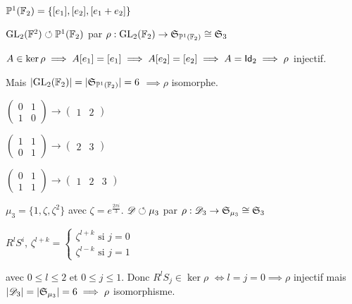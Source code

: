 \documentclass[french,a4paper,10pt]{article}
\begin{document}
	\begin{td-sol}
		$\mathbb{P}^1(\mathbb{F}_2) = \{[e_1], [e_2], [e_1+e_2]\}$
		
		$\text{GL}_{2}(\mathbb{F}^2) \circlearrowleft \mathbb{P}^1(\mathbb{F}_2)$ par $\rho: \text{GL}_{2}(\mathbb{F}_2) \to \mathfrak{S}_{\mathbb{P}^1(\mathbb{F}_2)} \cong
		\mathfrak{S}_3$
		
		$A\in \ker \rho \implies A[e_1] = [e_1]
		\implies A[e_2] = [e_2] \implies A = \operatorname{\mathsf{Id}}_2 \implies \rho$ injectif.
		
		Mais $| \text{GL}_{2}(\mathbb{F}_2) | = | \mathfrak{S}_{\mathbb{P}^1(\mathbb{F}_2)} | = 6$
		$\implies \rho$ isomorphe.
		
		$
		\begin{pmatrix}
			0 & 1 \\ 1 & 0
		\end{pmatrix} \to \begin{pmatrix}
			1 & 2
		\end{pmatrix}
		$
		
		$
		\begin{pmatrix}
			1 & 1 \\ 0 & 1
		\end{pmatrix} \to \begin{pmatrix}
			2 & 3
		\end{pmatrix}
		$
		
		$
		\begin{pmatrix}
			0 & 1 \\ 1 & 1
		\end{pmatrix} \to \begin{pmatrix}
			1 & 2 & 3
		\end{pmatrix}
		$
		
		$\mu_3 = \{1,\zeta,\zeta^2\}$ avec $\zeta = e^{\frac{2\pi i}{3}}$.
		$\mathscr{D} \circlearrowleft \mu_3$ par $\rho: \mathscr{D}_3 \to \mathfrak{S}_{\mu_3} \cong \mathfrak{S}_{3}$
		
		$R^l S^i$, $\zeta^{l+k} = \begin{cases}\zeta^{l+k} \textrm{ si } j = 0\\
			\zeta^{l-k} \textrm{ si } j = 1 \end{cases}$
		
		avec $0 \leq l \leq 2$ et $0\leq j\leq 1$. Donc $R^lS_j\in \ker \rho$
		$\Longleftrightarrow l = j = 0 \implies \rho$ injectif mais 
		$|\mathscr{D}_3| = |\mathfrak{S}_{\mu_3}| = 6 \implies \rho$ isomorphisme.
	\end{td-sol}
	
\end{document}

